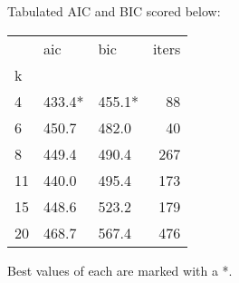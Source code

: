 Tabulated AIC and BIC scored below:
\vspace{4mm}

\begin{tabular}{lllr}
\toprule
{} &     aic &     bic &  iters \\
k  &         &         &        \\
\midrule
4  &  433.4* &  455.1* &     88 \\
6  &   450.7 &   482.0 &     40 \\
8  &   449.4 &   490.4 &    267 \\
11 &   440.0 &   495.4 &    173 \\
15 &   448.6 &   523.2 &    179 \\
20 &   468.7 &   567.4 &    476 \\
\bottomrule
\end{tabular}

\vspace{4mm}
\noindent Best values of each are marked with a *.


